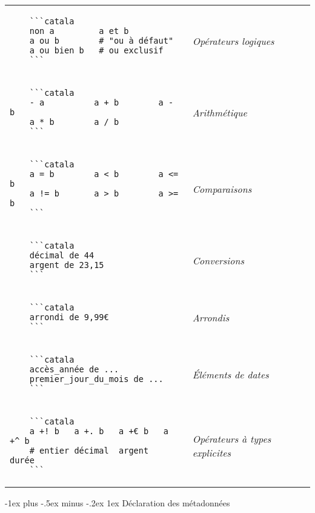 \documentclass{article}
\makeatletter
\newcommand\articlenormalsize{\fontsize{10pt}{12pt}\selectfont}
\renewcommand{\section}{\@startsection{section}{1}{0mm}%
                                {-1ex plus -.5ex minus -.2ex}%
                                {1ex}%
                                {\normalfont\articlenormalsize\bfseries}}
\newenvironment{catala}{%
  \VerbatimEnvironment
  \let\FV@ListVSpace\relax
  \begin{verbatim}}%
 {\end{verbatim}}
\makeatother
\begin{document}
\begin{multicols}{3}
\begin{tabular}{@{}p{\cola}>{\slshape}p{\colb}@{}}
  \begin{catala}
    ```catala
    non a         a et b
    a ou b        # "ou à défaut"
    a ou bien b   # ou exclusif
    ```
  \end{catala}
  & Opérateurs logiques
  \\
  \begin{catala}
    ```catala
    - a          a + b        a - b
    a * b        a / b
    ```
  \end{catala}
  & Arithmétique
  \\
  \begin{catala}
    ```catala
    a = b        a < b        a <= b
    a != b       a > b        a >= b
    ```
  \end{catala}
  & Comparaisons
  \\
  \begin{catala}
    ```catala
    décimal de 44
    argent de 23,15
    ```
  \end{catala}
  & Conversions
  \\
  \begin{catala}
    ```catala
    arrondi de 9,99€
    ```
  \end{catala}
  & Arrondis
  \\
  \begin{catala}
    ```catala
    accès_année de ...
    premier_jour_du_mois de ...
    ```
  \end{catala}
  & Éléments de dates
  \\
  \begin{catala}
    ```catala
    a +! b   a +. b   a +€ b   a +^ b
    # entier décimal  argent   durée
    ```
  \end{catala}
  & Opérateurs à types explicites
  \\
\end{tabular}

\section{Déclaration des métadonnées}

\begin{tabular}{@{}p{\cola}>{\slshape}p{\colb}@{}}


\end{tabular}
\end{multicols}
\end{document}
